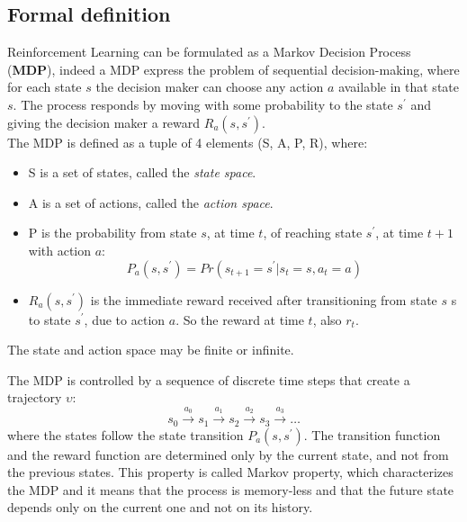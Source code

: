 \documentclass[14pt]{extarticle}
\def\sp{\vspace{5pt}}
\def\ppn{\vspace{10pt}}
\begin{document}
\begin{flushleft}
\subsection{Formal definition}
\sp
Reinforcement Learning can be formulated as a Markov Decision Process (\textbf{MDP}), indeed a MDP express the problem of sequential decision-making, where for each state $s$ the decision maker can choose any action $a$ available in that state $s$. The process responds by moving with some probability to the state $s^\prime$ and giving the decision maker a reward $R_a(s,s^\prime)$. %
\\
The MDP is defined as a tuple of 4 elements (S, A, P, R), where:
\begin{itemize}
\item S is a set of states, called the \emph{state space}.
\item A is a set of actions, called the \emph{action space}.
\item P is the probability from state $s$, at time $t$, of reaching state $s^\prime$, at time $t+1$ with action $a$:
\[P_a(s,s^\prime) = Pr(s_{t+1} = s^\prime | s_t = s, a_t = a)\]
\item $R_a(s,s^\prime)$ is the immediate reward received after transitioning from state $s$ s to state $s^\prime$, due to action $a$. So the reward at time $t$, also $r_t$.
\end{itemize}
The state and action space may be finite or infinite.

\ppn
The MDP is controlled by a sequence of discrete time steps that create a trajectory $\upsilon$:
\[s_0 \xrightarrow{a_0} s_1 \xrightarrow{a_1} s_2 \xrightarrow{a_2} s_3 \xrightarrow{a_3} \dotso\]
where the states follow the state transition $P_a(s,s^\prime)$. The transition function and the reward function are determined only by the current state, and not from the previous states. This property is called Markov property, which characterizes the MDP and it means that the process is memory-less and that the future state depends only on the current one and not on its history. 


\end{flushleft}
\end{document}
